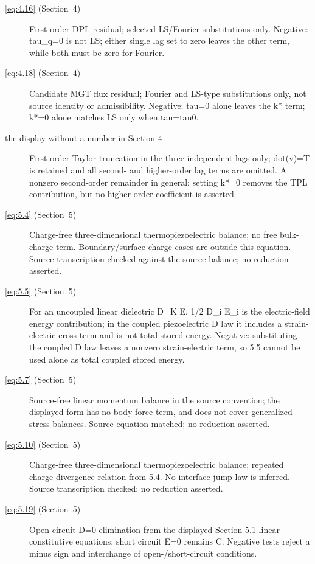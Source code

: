 \begin{description}
  \item[\eqref{eq:4.16} (Section~4)] First-order DPL residual; selected LS/Fourier substitutions only. Negative: tau\_q=0 is not LS; either single lag set to zero leaves the other term, while both must be zero for Fourier.

  \item[\eqref{eq:4.18} (Section~4)] Candidate MGT flux residual; Fourier and LS-type substitutions only, not source identity or admissibility. Negative: tau=0 alone leaves the k* term; k*=0 alone matches LS only when tau=tau0.

  \item[the display without a number in Section 4] First-order Taylor truncation in the three independent lags only; dot(v)=T is retained and all second- and higher-order lag terms are omitted. A nonzero second-order remainder in general; setting k*=0 removes the TPL contribution, but no higher-order coefficient is asserted.

  \item[\eqref{eq:5.4} (Section~5)] Charge-free three-dimensional thermopiezoelectric balance; no free bulk-charge term. Boundary/surface charge cases are outside this equation. Source transcription checked against the source balance; no reduction asserted.

  \item[\eqref{eq:5.5} (Section~5)] For an uncoupled linear dielectric D=K E, 1/2 D\_i E\_i is the electric-field energy contribution; in the coupled piezoelectric D law it includes a strain-electric cross term and is not total stored energy. Negative: substituting the coupled D law leaves a nonzero strain-electric term, so 5.5 cannot be used alone as total coupled stored energy.

  \item[\eqref{eq:5.7} (Section~5)] Source-free linear momentum balance in the source convention; the displayed form has no body-force term, and does not cover generalized stress balances. Source equation matched; no reduction asserted.

  \item[\eqref{eq:5.10} (Section~5)] Charge-free three-dimensional thermopiezoelectric balance; repeated charge-divergence relation from 5.4. No interface jump law is inferred. Source transcription checked; no reduction asserted.

  \item[\eqref{eq:5.19} (Section~5)] Open-circuit D=0 elimination from the displayed Section 5.1 linear constitutive equations; short circuit E=0 remains C. Negative tests reject a minus sign and interchange of open-/short-circuit conditions.


\end{description}
